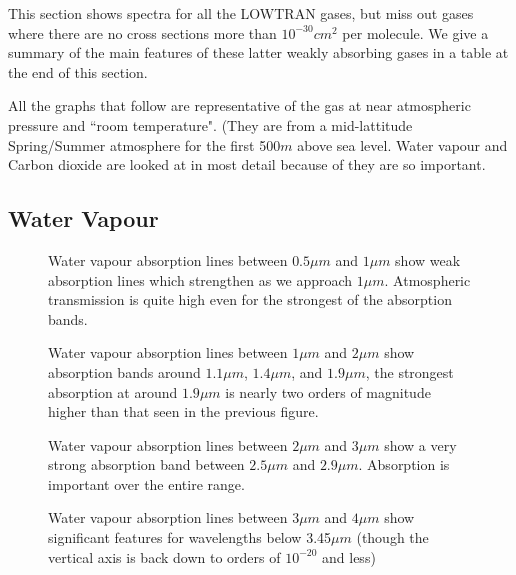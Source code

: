 \documentclass[12pt]{article}
\begin{document}
This section  shows spectra for all the LOWTRAN gases, but miss
 out gases where there are no cross sections more than $10^{-30}cm^2$ per molecule. We 
 give a summary of the main features of these latter weakly absorbing gases in a table at the end of this section. 

 All the graphs that follow
are representative of the gas at near atmospheric pressure and ``room temperature". (They are from a
 mid-lattitude Spring/Summer atmosphere for the first 500$m$ above sea level. Water vapour and Carbon dioxide
are looked at in most detail because of they are so important.


\newpage

\subsection{Water Vapour}

\vspace*{11.5cm}
\begin{figure}[htb]
\caption{Water vapour absorption lines between $0.5\mu m$ and $1\mu m$ show weak absorption lines
which strengthen as we approach $1\mu m$. Atmospheric transmission is quite high even for the strongest
of the absorption bands.}  
\end{figure}
\newpage

\vspace*{11.5cm}
\begin{figure}[htb]
\caption{Water vapour absorption lines between $1\mu m$ and $2\mu m$ show absorption bands
around $1.1\mu m$, $1.4\mu m$, and $1.9 \mu m$, the strongest absorption at around $1.9 \mu m$ is
nearly two orders of magnitude higher than that seen in the previous figure.}  
\end{figure}
\newpage

\vspace*{11.5cm}
\begin{figure}[htb]
\caption{Water vapour absorption lines between $2\mu m$ and $3\mu m$ show a very strong absorption band
between $2.5\mu m$  and $2.9 \mu m$. Absorption is important over the entire range.}
\end{figure}
\newpage

\vspace*{11.5cm}
\begin{figure}[htb]
\caption{Water vapour absorption lines between $3\mu m$ and $4\mu m$
   show significant features for wavelengths below 3.45$\mu m$ (though the vertical axis
 is back down to orders of $10^{-20}$ and less) }    
\end{figure}
\newpage
\end{document}
